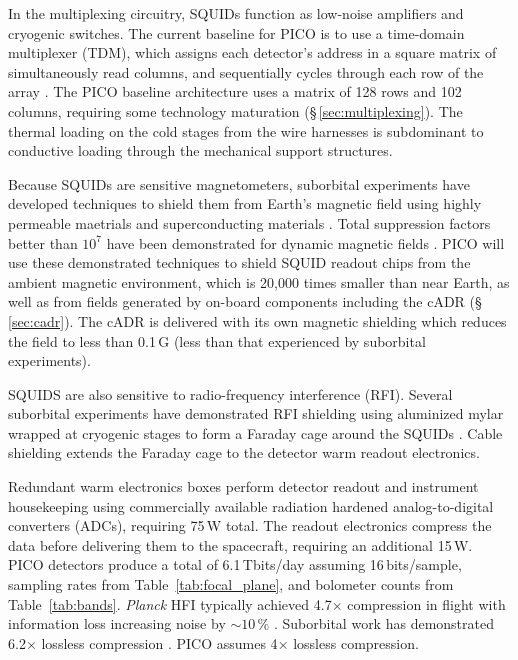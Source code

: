 In the multiplexing circuitry, SQUIDs function as
low-noise amplifiers and cryogenic switches. The current baseline for
PICO is to use a time-domain multiplexer (TDM), which assigns each
detector's address in a square matrix of simultaneously read columns,
and sequentially cycles through each row of the array
\citep{Henderson2016}. The PICO baseline architecture uses a matrix of
128 rows and 102 columns, requiring some technology maturation
(\S\,\ref{sec:multiplexing}). The thermal loading on
the cold stages from the wire harnesses is subdominant to conductive
loading through the mechanical support structures.  

Because SQUIDs are sensitive magnetometers, suborbital experiments
have developed techniques to shield them from Earth's magnetic field
using highly permeable maetrials and superconducting materials
\citep{Hui2018}.  Total suppression factors better than $10^7$ have
been demonstrated for dynamic magnetic fields \citep{Runyan2010}. PICO
will use these demonstrated techniques to shield SQUID readout chips
from the ambient magnetic environment, which is 20,000 times smaller
than near Earth, as well as from fields generated by on-board
components including the cADR (\S\,\ref{sec:cadr}). The cADR is
delivered with its own magnetic shielding which reduces the field to
less than 0.1\,G (less than that experienced by suborbital
experiments).

SQUIDS are also sensitive to radio-frequency interference
(RFI). Several suborbital experiments have demonstrated RFI shielding
using aluminized mylar wrapped at cryogenic stages to form a Faraday
cage around the SQUIDs \citep{Kermish2012,EBEX2018,BICEP2014}.
 Cable shielding extends the Faraday cage to
the detector warm readout electronics.

Redundant warm electronics boxes perform detector readout and
instrument housekeeping using commercially available radiation
hardened analog-to-digital converters (ADCs), requiring 75\,W total.
The readout electronics compress the data before delivering them to
the spacecraft, requiring an additional 15\,W. PICO detectors produce
a total of 6.1\,Tbits/day assuming 16\,bits/sample, sampling rates
from Table~\ref{tab:focal_plane}, and bolometer counts from
Table~\ref{tab:bands}. \textit{Planck} HFI typically achieved
4.7$\times$ compression in flight with information loss increasing
noise by $\sim10\,\%$ \citep{Pajot2018,PlanckHFI2011}. Suborbital work
has demonstrated 6.2$\times$ lossless compression
\citep{EBEX2017}. PICO assumes 4$\times$ lossless compression.

